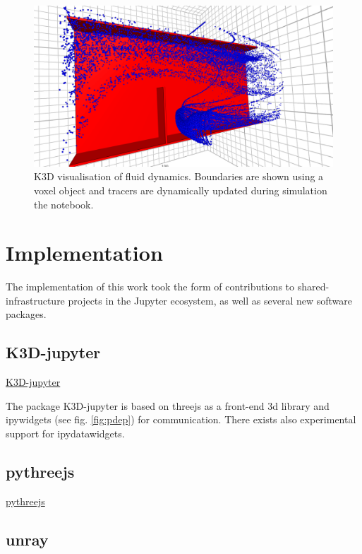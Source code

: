 \documentclass{deliverablereport}
\begin{document}
\begin{figure}[ht]
  \includegraphics[width=\textwidth,trim={0 0 0 1px},clip]{k3d_cfd2.png}
  \caption{K3D visualisation of fluid
  dynamics. Boundaries are shown using a voxel object and tracers are
  dynamically updated during simulation the notebook.}
\end{figure}
 



\section{Implementation}

The implementation of this work took the form of contributions to shared-infrastructure projects in the Jupyter ecosystem, as well as several new software packages.

\subsection{K3D-jupyter}

\href{https://github.com/K3D-tools/K3D-jupyter}{K3D-jupyter}

The package K3D-jupyter is based on threejs as a front-end 3d library
and ipywidgets (see fig. \ref{fig:pdep}) for communication.  There exists also
experimental support for ipydatawidgets. 



\subsection{pythreejs}

\href{https://github.com/jupyter-widgets/pythreejs}{pythreejs}

\subsection{unray}
\end{document}
